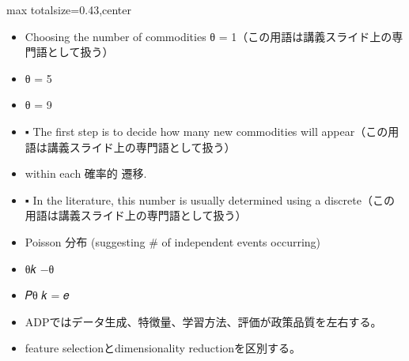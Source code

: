 \clearpage
{}
\begin{minipage}[t]{0.405\textwidth}
\begin{adjustbox}{max totalsize={\textwidth}{0.43\textheight},center}
\begin{minipage}{\textwidth}\scriptsize
{}\begin{itemize}
\item Choosing the number of commodities θ = 1（この用語は講義スライド上の専門語として扱う）
\item θ = 5
\item θ = 9
\item ▪ The first step is to decide how many new commodities will appear（この用語は講義スライド上の専門語として扱う）
\item within each 確率的 遷移.
\item ▪ In the literature, this number is usually determined using a discrete（この用語は講義スライド上の専門語として扱う）
\item Poisson 分布 (suggesting \# of independent events occurring)
\item θ𝑘 −θ
\item 𝑃θ 𝑘 = 𝑒
\end{itemize}\begin{itemize}
\item ADPではデータ生成、特徴量、学習方法、評価が政策品質を左右する。
\item feature selectionとdimensionality reductionを区別する。
\end{itemize}
\end{minipage}
\end{adjustbox}
\end{minipage}\hfill
